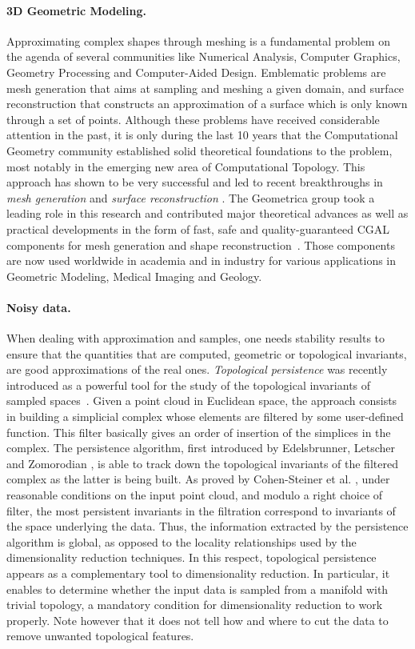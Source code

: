 \paragraph{3D Geometric Modeling.}
Approximating complex shapes through meshing is a fundamental problem on the agenda of several communities like Numerical Analysis, Computer Graphics, Geometry Processing and Computer-Aided Design.  Emblematic problems are mesh generation that aims at sampling and meshing a given domain, and surface reconstruction that constructs an approximation of a surface which is only known through a set of points. Although these problems have received considerable attention in the past, it is only during the last 10 years that 
the Computational Geometry community established solid theoretical foundations to the problem, most notably in the emerging new area of Computational Topology. This approach has shown to be very successful and led to recent breakthroughs in {\em mesh generation} \cite{geometrica-bcmrv-ms-06} and {\em surface reconstruction} \cite{dey-csr-2007}.  The Geometrica group took a leading role in this research and contributed major theoretical advances as well as practical developments in the form of fast, safe and quality-guaranteed CGAL components for mesh generation and shape reconstruction~\cite{cgal:rty-m3-11}. Those components are now used worldwide in academia and in industry for various applications in Geometric Modeling, Medical Imaging and Geology.

\paragraph{Noisy data.}
When dealing with approximation and samples, one needs stability results to ensure that the quantities that are computed, geometric or topological invariants, are good approximations of the real ones. {\em Topological persistence} was recently introduced as a powerful tool for the study of the topological invariants of sampled spaces~\cite{eh-ph-2008,rg-bptd-2008}. Given a point cloud in Euclidean space, the approach consists in building a simplicial complex whose elements are filtered by some user-defined function. This filter basically gives an order of insertion of the simplices in the complex. The persistence algorithm, first introduced by Edelsbrunner, Letscher and Zomorodian \cite{elz-tps-2002}, is able to track down the topological invariants of the filtered complex as the latter is being built. As proved by Cohen-Steiner et al. \cite{geometrica-cseh-07}, under reasonable conditions on the input point cloud, and modulo a right choice of filter, the most persistent invariants in the filtration correspond to invariants of the space underlying the data. Thus, the information extracted by the persistence algorithm is global, as opposed to the locality relationships used by the dimensionality reduction techniques. In this respect, topological persistence appears as a complementary tool to dimensionality reduction. In particular, it enables to determine whether the input data is sampled from a manifold with trivial topology, a mandatory condition for dimensionality reduction to work properly. Note however that it does not tell how and where to cut the data to remove unwanted topological features.

